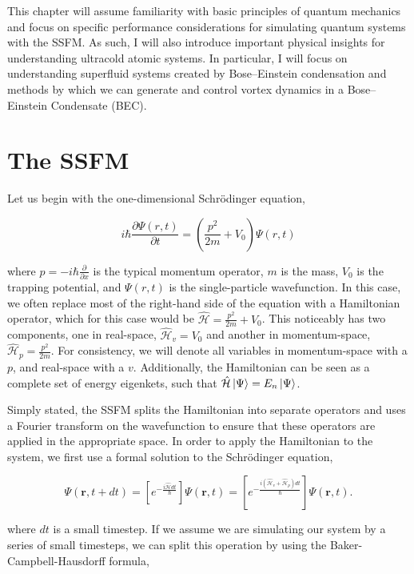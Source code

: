 This chapter will assume familiarity with basic principles of quantum mechanics and focus on specific performance considerations for simulating quantum systems with the SSFM.
As such, I will also introduce important physical insights for understanding ultracold atomic systems.
In particular, I will focus on understanding superfluid systems created by Bose--Einstein condensation and methods by which we can generate and control vortex dynamics in a Bose--Einstein Condensate (BEC).


\section{The SSFM}
Let us begin with the one-dimensional Schr\"odinger equation,

\begin{equation}
i\hbar \frac{\partial \Psi(r, t)}{\partial t} = \left(\frac{p^2}{2m} + V_0 \right)\Psi(r,t)
\label{eqn:schrody}
\end{equation}

\noindent where $p = -i\hbar\frac{\partial}{\partial x}$ is the typical momentum operator, $m$ is the mass, $V_0$ is the trapping potential, and $\Psi(r,t)$ is the single-particle wavefunction.
In this case, we often replace most of the right-hand side of the equation with a Hamiltonian operator, which for this case would be $\mathcal{\hat H} = \frac{p^2}{2m} + V_0$.
This noticeably has two components, one in real-space, $\mathcal{\hat H}_v = V_0$ and another in momentum-space, $\mathcal{\hat H}_p = \frac{p^2}{2m}$.
For consistency, we will denote all variables in momentum-space with a $p$, and real-space with a $v$.
Additionally, the Hamiltonian can be seen as a complete set of energy eigenkets, such that $\mathcal{\hat H}\ket{\Psi} = E_n\ket{\Psi}$.

Simply stated, the SSFM splits the Hamiltonian into separate operators and uses a Fourier transform on the wavefunction to ensure that these operators are applied in the appropriate space.
In order to apply the Hamiltonian to the system, we first use a formal solution to the Schr\"odinger equation,

\begin{equation}
\Psi(\mathbf{r},t + dt) = \left[e^{-\frac{i\mathcal{\hat{H}}dt}{\hbar}}\right]\Psi(\mathbf{r},t) = \left[e^{-\frac{i(\mathcal{\hat{H}}_v + \mathcal{\hat{H}}_p)dt}{\hbar}}\right]\Psi(\mathbf{r},t).
\end{equation}

\noindent where $dt$ is a small timestep.
If we assume we are simulating our system by a series of small timesteps, we can split this operation by using the Baker-Campbell-Hausdorff formula,

